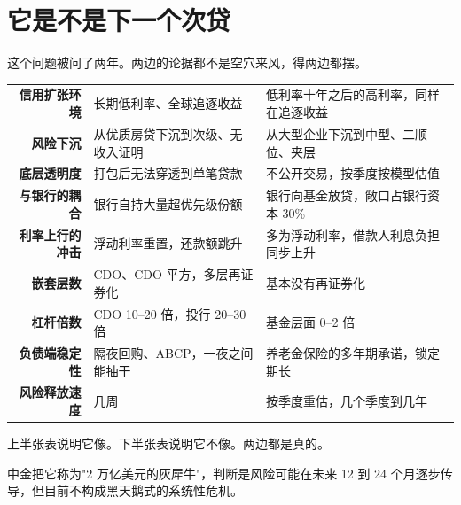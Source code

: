 \begin{talkbox}
\end{talkbox}

\section{它是不是下一个次贷}

这个问题被问了两年。两边的论据都不是空穴来风，得两边都摆。

\begin{tablewrap}
\begin{xltabular}{\linewidth}{rXX}
\toprule
{} &  &  \\
\midrule
\textbf{信用扩张环境} & 长期低利率、全球追逐收益 & 低利率十年之后的高利率，同样在追逐收益 \\
\textbf{风险下沉} & 从优质房贷下沉到次级、无收入证明 & 从大型企业下沉到中型、二顺位、夹层 \\
\textbf{底层透明度} & 打包后无法穿透到单笔贷款 & 不公开交易，按季度按模型估值 \\
\textbf{与银行的耦合} & 银行自持大量超优先级份额 & 银行向基金放贷，敞口占银行资本 30\% \\
\textbf{利率上行的冲击} & 浮动利率重置，还款额跳升 & 多为浮动利率，借款人利息负担同步上升 \\
\textbf{嵌套层数} & CDO、CDO 平方，多层再证券化 & 基本没有再证券化 \\
\textbf{杠杆倍数} & CDO 10–20 倍，投行 20–30 倍 & 基金层面 0–2 倍 \\
\textbf{负债端稳定性} & 隔夜回购、ABCP，一夜之间能抽干 & 养老金保险的多年期承诺，锁定期长 \\
\textbf{风险释放速度} & 几周 & 按季度重估，几个季度到几年 \\
\bottomrule
\end{xltabular}
\end{tablewrap}

上半张表说明它像。下半张表说明它不像。两边都是真的。

中金把它称为"2 万亿美元的灰犀牛"，判断是风险可能在未来 12 到 24 个月逐步传导，但目前不构成黑天鹅式的系统性危机。

